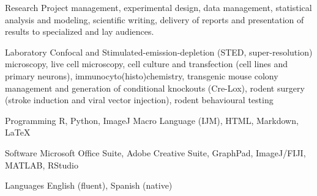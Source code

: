 

\begin{cvskills}

  \cvskill
    {Research} %
    {Project management, experimental design, data management, statistical analysis and modeling, scientific writing, delivery of reports and presentation of results to specialized and lay audiences.} %

  \cvskill
    {Laboratory} %
    {Confocal and Stimulated-emission-depletion (STED, super-resolution) microscopy, live cell microscopy, cell culture and transfection (cell lines and primary neurons), immunocyto(histo)chemistry, transgenic mouse colony management and generation of conditional knockouts (Cre-Lox), rodent surgery (stroke induction and viral vector injection), rodent behavioural testing} %

  \cvskill
    {Programming} %
    {R, Python, ImageJ Macro Language (IJM), HTML, Markdown, \LaTeX} %

  \cvskill
    {Software} %
    {Microsoft Office Suite, Adobe Creative Suite, GraphPad, ImageJ/FIJI, MATLAB, RStudio} %

  \cvskill
    {Languages} %
    {English (fluent), Spanish (native)} %

  
\end{cvskills}
